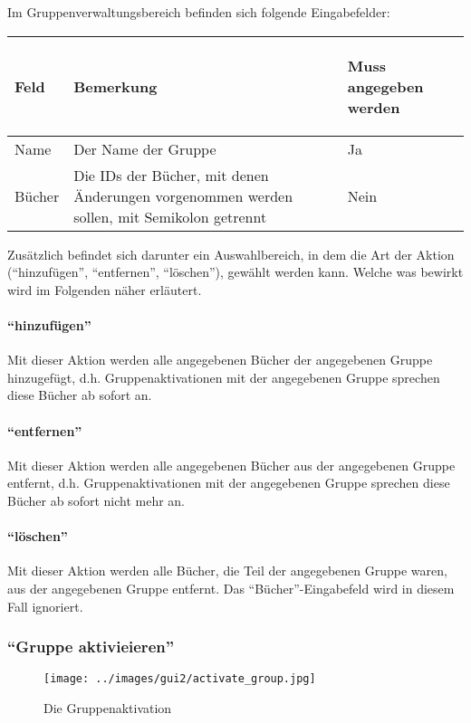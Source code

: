 Im Gruppenverwaltungsbereich befinden sich folgende Eingabefelder:

\begin{tabular}{|p{}|p{}|p{}|}\hline
\begin{center}Feld\end{center} & \begin{center}Bemerkung\end{center} & \begin{center}Muss angegeben werden\end{center}\\
\hline
Name & Der Name der Gruppe & Ja\\
\hline
Bücher & Die IDs der Bücher, mit denen Änderungen vorgenommen werden sollen, mit Semikolon getrennt & Nein\\
\hline
\end{tabular}

Zusätzlich befindet sich darunter ein Auswahlbereich, in dem die Art der Aktion (``hinzufügen'', ``entfernen'', ``löschen''), gewählt werden kann. Welche was bewirkt wird im Folgenden näher erläutert.

\paragraph{``hinzufügen''}
Mit dieser Aktion werden alle angegebenen Bücher der angegebenen Gruppe hinzugefügt, d.h. Gruppenaktivationen mit der angegebenen Gruppe sprechen diese Bücher ab sofort an.

\paragraph{``entfernen''}
Mit dieser Aktion werden alle angegebenen Bücher aus der angegebenen Gruppe entfernt, d.h. Gruppenaktivationen mit der angegebenen Gruppe sprechen diese Bücher ab sofort nicht mehr an.

\paragraph{``löschen''}
Mit dieser Aktion werden alle Bücher, die Teil der angegebenen Gruppe waren, aus der angegebenen Gruppe entfernt. Das ``Bücher''-Eingabefeld wird in diesem Fall ignoriert.


\subsubsection{``Gruppe aktivieieren''}
\label{subsubsec:detail:edit:activate_group}
\begin{figure}\texttt{[image: ../images/gui2/activate\_group.jpg]}\caption{Die Gruppenaktivation}\label{fig:activate_group}\end{figure}

